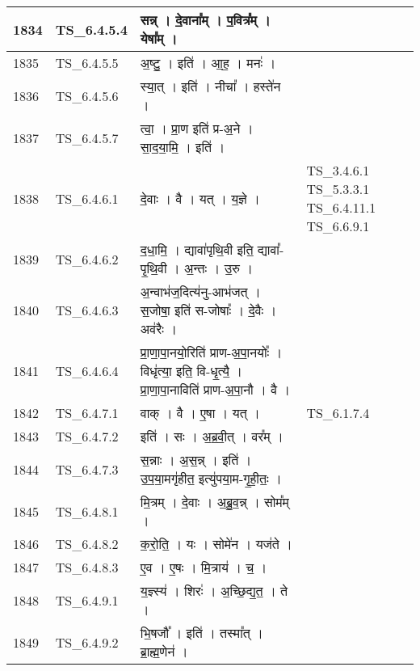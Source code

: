 \documentclass[17pt]{extarticle}
\begin{document}
\begin{longtable}{||p{0.4in}||p{0.9in}||p{4.0in}||p{0.9in}||}
        \hline
            1834 & TS\_6.4.5.4 & सन्न्   ।   दे॒वाना᳚म्   ।   प॒वित्र᳚म्   ।   येषा᳚म्   ।    &      \\
        \hline
            1835 & TS\_6.4.5.5 & अ॒ष्टु॒   ।   इति॑   ।   आ॒ह॒   ।   मनः॑   ।    &      \\
        \hline
            1836 & TS\_6.4.5.6 & स्या॒त्   ।   इति॑   ।   नीचा᳚   ।   हस्ते॑न   ।    &      \\
        \hline
            1837 & TS\_6.4.5.7 & त्वा॒   ।   प्रा॒ण इति॑ प्र{-}अ॒ने   ।   सा॒द॒या॒मि॒   ।   इति॑   ।    &      \\
        \hline
            1838 & TS\_6.4.6.1 & दे॒वाः   ।   वै   ।   यत्   ।   य॒ज्ञे   ।    & TS\_3.4.6.1 TS\_5.3.3.1  TS\_6.4.11.1 TS\_6.6.9.1       \\
        \hline
            1839 & TS\_6.4.6.2 & द॒धा॒मि॒   ।   द्यावा॑पृथि॒वी इति॒ द्यावा᳚{-}पृ॒थि॒वी   ।   अ॒न्तः   ।   उ॒रु   ।    &      \\
        \hline
            1840 & TS\_6.4.6.3 & अ॒न्वाभ॑ज॒दित्य॑नु{-}आभ॑जत्   ।   स॒जोषा॒ इति॑ स{-}जोषाः᳚   ।   दे॒वैः   ।   अव॑रैः   ।    &      \\
        \hline
            1841 & TS\_6.4.6.4 & प्रा॒णा॒पा॒नयो॒रिति॑ प्राण{-}अ॒पा॒नयोः᳚   ।   विधृ॑त्या॒ इति॒ वि{-}धृ॒त्यै॒   ।   प्रा॒णा॒पा॒नाविति॑ प्राण{-}अ॒पा॒नौ   ।   वै   ।    &      \\
        \hline
            1842 & TS\_6.4.7.1 & वाक्   ।   वै   ।   ए॒षा   ।   यत्   ।    & TS\_6.1.7.4        \\
        \hline
            1843 & TS\_6.4.7.2 & इति॑   ।   सः   ।   अ॒ब्र॒वी॒त्   ।   वर᳚म्   ।    &      \\
        \hline
            1844 & TS\_6.4.7.3 & स॒न्नाः   ।   अ॒स॒न्न्   ।   इति॑   ।   उ॒प॒या॒मगृ॑हीत॒ इत्यु॑पया॒म{-}गृ॒ही॒तः॒   ।    &      \\
        \hline
            1845 & TS\_6.4.8.1 & मि॒त्रम्   ।   दे॒वाः   ।   अ॒ब्रु॒व॒न्न्   ।   सोम᳚म्   ।    &      \\
        \hline
            1846 & TS\_6.4.8.2 & क॒रो॒ति॒   ।   यः   ।   सोमे॑न   ।   यज॑ते   ।    &      \\
        \hline
            1847 & TS\_6.4.8.3 & ए॒व   ।   ए॒षः   ।   मि॒त्राय॑   ।   च॒   ।    &      \\
        \hline
            1848 & TS\_6.4.9.1 & य॒ज्ञ्स्य॑   ।   शिरः॑   ।   अ॒च्छि॒द्य॒त॒   ।   ते   ।    &      \\
        \hline
            1849 & TS\_6.4.9.2 & भि॒षजौ᳚   ।   इति॑   ।   तस्मा᳚त्   ।   ब्रा॒ह्म॒णेन॑   ।    &      \\

\end{longtable}
\end{document}
